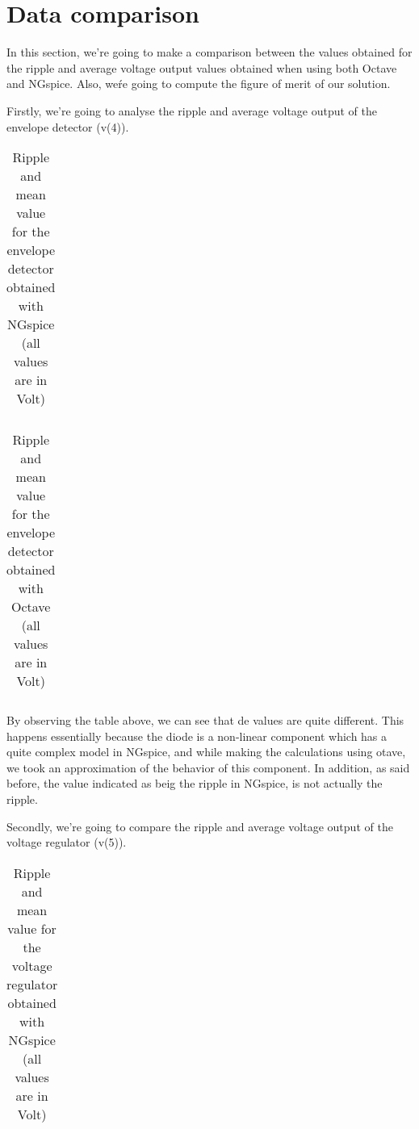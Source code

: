 \section{Data comparison}
\label{sec:comparison}

\par In this section, we're going to make a comparison between the values obtained for the ripple and average voltage output values obtained when using both Octave and NGspice. Also, weŕe going to compute the figure of merit of our solution.
\par Firstly, we're going to analyse the ripple and average voltage output of the envelope detector (v(4)).

\vspace{5mm}
\begin{table}[h!]
\centering
\begin{tabularx}{0.9\textwidth} {
  | >{\raggedright\arraybackslash}X
  | >{\raggedleft\arraybackslash}X | }
 \hline

\end{tabularx}
\caption{\label{tab:Table 6} Ripple and mean value for the envelope detector obtained with NGspice (all values are in Volt)}
\end{table}
\vspace{5mm}

\begin{table}[h!]
\centering
\begin{tabularx}{0.9\textwidth} {
  | >{\raggedright\arraybackslash}X
  | >{\raggedleft\arraybackslash}X | }
 \hline

\end{tabularx}
\caption{\label{tab:Table 7} Ripple and mean value for the envelope detector obtained with Octave (all values are in Volt)}
\end{table}
\vspace{5mm}

\par By observing the table above, we can see that de values are quite different. This happens essentially because the diode is a non-linear component which has a quite complex model in NGspice, and while making the calculations using otave, we took an approximation of the behavior of this component. In addition, as said before, the value indicated as beig the ripple in NGspice, is not actually the ripple.
\par Secondly, we're going to compare the ripple and average voltage output of the voltage regulator (v(5)).

\vspace{5mm}
\begin{table}[h!]
\centering
\begin{tabularx}{0.9\textwidth} {
  | >{\raggedright\arraybackslash}X
  | >{\raggedleft\arraybackslash}X | }
 \hline

\end{tabularx}
\caption{\label{tab:Table 8} Ripple and mean value for the voltage regulator obtained with NGspice (all values are in Volt)}
\end{table}
\vspace{5mm}

